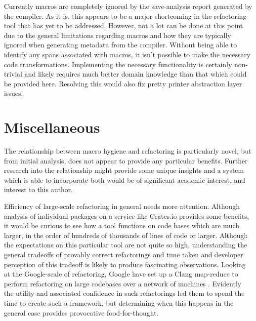 
Currently macros are completely ignored by the save-analysis report generated by the compiler. As it is, this appears to be a major shortcoming in the refactoring tool that has yet to be addressed. However, not a lot can be done at this point due to the general limitations regarding macros and how they are typically ignored when generating metadata from the compiler. Without being able to identify any spans associated with macros, it isn't possible to make the necessary code transformations. Implementing the necessary functionality is certainly non-trivial and likely requires much better domain knowledge than that which could be provided here. Resolving this would also fix pretty printer abstraction layer issues.

\section{Miscellaneous}


The relationship between macro hygiene and refactoring is particularly novel, but from initial analysis, does not appear to provide any particular benefits. Further research into the relationship might provide some unique insights and a system which is able to incorporate both would be of significant academic interest, and interest to this author.

Efficiency of large-scale refactoring in general needs more attention. Although analysis of individual packages on a service like Crates.io provides some benefits, it would be curious to see how a tool functions on code bases which are much larger, in the order of hundreds of thousands of lines of code or larger. Although the expectations on this particular tool are not quite so high, understanding the general tradeoffs of provably correct refactorings and time taken and developer perception of this tradeoff is likely to produce fascinating observations. Looking at the Google-scale of refactoring, Google have set up a Clang map-reduce to perform refactoring on large codebases over a network of machines \cite{carruth2011clang}. Evidently the utility and associated confidence in such refactorings led them to spend the time to create such a framework, but determining when this happens in the general case provides provocative food-for-thought.

